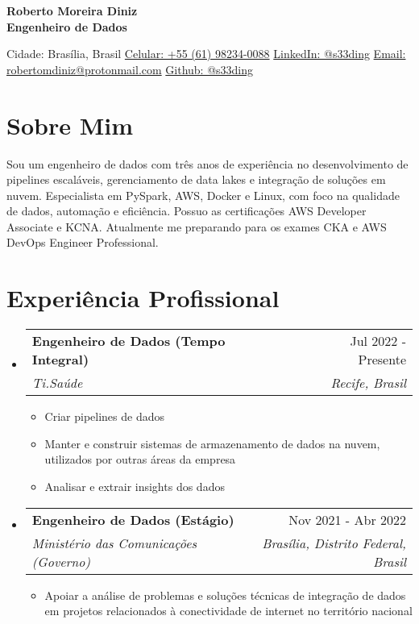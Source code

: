 \documentclass[letterpaper,11pt]{article}%
\makeatletter
\newcommand{\resumeItem}[1]{\item{#1 \vspace{-3pt}}}%
\newcommand{\resumeSubheading}[4]{\vspace{-1pt}\item\begin{tabular*}{0.97\textwidth}[t]{l@{\extracolsep{\fill}}r}\textbf{#1} & #2 \\\textit{\small #3} & \textit{\small #4} \\\end{tabular*}\vspace{-8pt}}%
\newcommand{\resumeSubHeadingListStart}{\begin{itemize}[leftmargin=0.15in, label={}, itemsep=0pt, parsep=0pt]}%
\newcommand{\resumeSubHeadingListEnd}{\end{itemize}}%
\newcommand{\resumeItemListStart}{\begin{itemize}[itemsep=0pt, parsep=0pt]}%
\newcommand{\resumeItemListEnd}{\end{itemize}\vspace{-1pt}}%
\makeatother
\begin{document}
%
\normalsize%
\begin{center}%
{\large \textbf{Roberto Moreira Diniz}} \\ \vspace{3pt}%
{\normalsize \textbf{Engenheiro de Dados}} \\ \vspace{3pt}%
\end{center}%
\begin{center}%
\small%
Cidade: Brasília, Brasil \quad \textbullet \quad \href{https://wa.me/qr/UYOUX2DZ7BYHI1}{Celular: +55 (61) 98234-0088} \quad \textbullet \quad \href{https://www.linkedin.com/in/s33ding/}{LinkedIn: @s33ding} \quad \textbullet \quad \href{mailto:robertomdiniz@protonmail.com}{Email: robertomdiniz@protonmail.com} \quad \textbullet \quad \href{https://github.com/s33ding}{Github: @s33ding}%
\normalsize%
\end{center}%
\section*{Sobre Mim}%
\label{sec:SobreMim}%
Sou um engenheiro de dados com três anos de experiência no desenvolvimento de pipelines escaláveis, gerenciamento de data lakes e integração de soluções em nuvem. Especialista em PySpark, AWS, Docker e Linux, com foco na qualidade de dados, automação e eficiência. Possuo as certificações AWS Developer Associate e KCNA. Atualmente me preparando para os exames CKA e AWS DevOps Engineer Professional.

%
\section*{Experiência Profissional}%
\label{sec:ExperinciaProfissional}%
\resumeSubHeadingListStart%
\resumeSubheading{Engenheiro de Dados (Tempo Integral)}{Jul 2022 - Presente}{Ti.Saúde}{Recife, Brasil}%
\resumeItemListStart%
\resumeItem{Criar pipelines de dados}%
\resumeItem{Manter e construir sistemas de armazenamento de dados na nuvem, utilizados por outras áreas da empresa}%
\resumeItem{Analisar e extrair insights dos dados}%
\resumeItemListEnd%
\resumeSubheading{Engenheiro de Dados (Estágio)}{Nov 2021 - Abr 2022}{Ministério das Comunicações (Governo)}{Brasília, Distrito Federal, Brasil}%
\resumeItemListStart%
\resumeItem{Apoiar a análise de problemas e soluções técnicas de integração de dados em projetos relacionados à conectividade de internet no território nacional}%
\resumeItemListEnd%
\resumeSubHeadingListEnd
\end{document}
